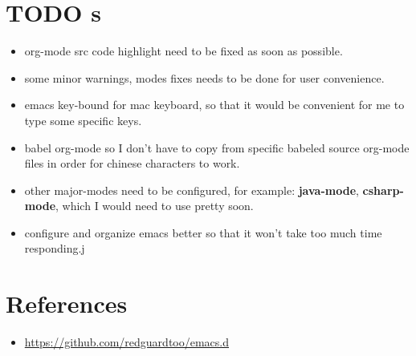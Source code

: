 \documentclass[9pt, b5paper]{article}
\begin{document}
\section{{\bfseries\sffamily TODO} s}
\label{sec:orgf216e25}
\begin{itemize}
\item org-mode src code highlight need to be fixed as soon as possible.
\item some minor warnings, modes fixes needs to be done for user convenience.
\item emacs key-bound for mac keyboard, so that it would be convenient for me to type some specific keys.
\item babel org-mode so I don't have to copy from specific babeled source org-mode files in order for chinese characters to work.
\item other major-modes need to be configured, for example: \textbf{java-mode}, \textbf{csharp-mode}, which I would need to use pretty soon.
\item configure and organize emacs better so that it won't take too much time responding.j
\end{itemize}

\section{References}
\label{sec:orgeeb6f7a}
\begin{itemize}
\item \url{https://github.com/redguardtoo/emacs.d}
\end{itemize}
\end{document}
